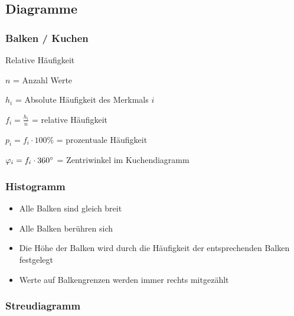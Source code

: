 \begin{multicols}{2}
\subsection{Diagramme}
\subsubsection{Balken / Kuchen}
\begin{definition}{Relative Häufigkeit}{}

$n$ = Anzahl Werte

$h_i$ = Absolute Häufigkeit des Merkmals $i$

$f_i = \frac{h_i}n$ = relative Häufigkeit

$p_i = f_i\cdot{}100\%$ = prozentuale Häufigkeit

$\varphi_i = f_i\cdot{}360^\circ$ = Zentriwinkel im Kuchendiagramm
\end{definition}



\subsubsection{Histogramm}
\begin{itemize}
\item Alle Balken sind gleich breit
\item Alle Balken berühren sich
\item Die Höhe der Balken wird durch die Häufigkeit der entsprechenden
Balken festgelegt
\item Werte auf Balkengrenzen werden immer rechts mitgezählt
\end{itemize}

\subsubsection{Streudiagramm}



\end{multicols}
